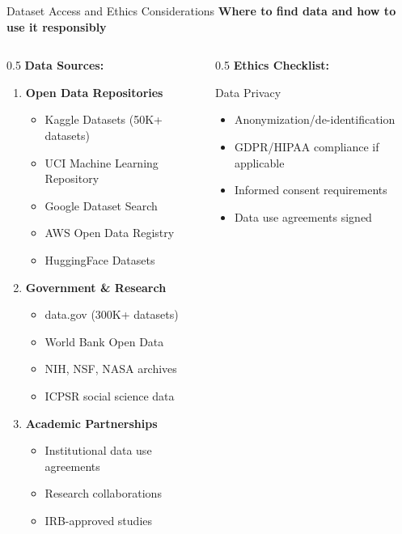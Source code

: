 \begin{frame}{Dataset Access and Ethics Considerations}
\textbf{Where to find data and how to use it responsibly}

\begin{columns}
\begin{column}{0.5\textwidth}
\textbf{Data Sources:}

\begin{enumerate}
\item \textbf{Open Data Repositories}
   \begin{itemize}
   \item Kaggle Datasets (50K+ datasets)
   \item UCI Machine Learning Repository
   \item Google Dataset Search
   \item AWS Open Data Registry
   \item HuggingFace Datasets
   \end{itemize}

\item \textbf{Government \& Research}
   \begin{itemize}
   \item data.gov (300K+ datasets)
   \item World Bank Open Data
   \item NIH, NSF, NASA archives
   \item ICPSR social science data
   \end{itemize}

\item \textbf{Academic Partnerships}
   \begin{itemize}
   \item Institutional data use agreements
   \item Research collaborations
   \item IRB-approved studies
   \end{itemize}
\end{enumerate}
\end{column}

\begin{column}{0.5\textwidth}
\textbf{Ethics Checklist:}

\begin{block}{Data Privacy}
\begin{itemize}
\item[$\square$] Anonymization/de-identification
\item[$\square$] GDPR/HIPAA compliance if applicable
\item[$\square$] Informed consent requirements
\item[$\square$] Data use agreements signed
\end{itemize}
\end{block}


\end{column}
\end{columns}
\end{frame}
